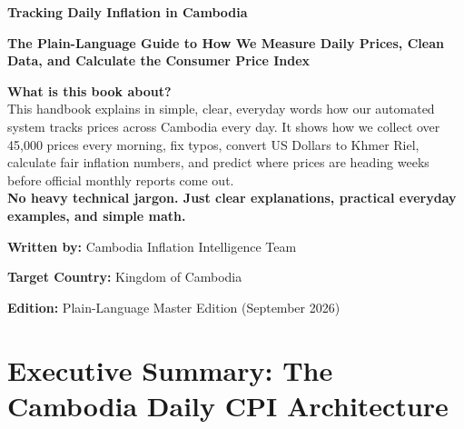 \documentclass[11pt,a4paper,oneside]{article}
\begin{document}
\begin{titlepage}
    \centering
    \vspace*{1.5cm}
    
    {\Huge\bfseries\color{NavyBlue} Tracking Daily Inflation in Cambodia\par}
    \vspace{0.4cm}
    {\LARGE\bfseries\color{Teal} The Plain-Language Guide to How We Measure Daily Prices, Clean Data, and Calculate the Consumer Price Index\par}
    \vspace{1.2cm}
    
    \begin{tcolorbox}[colback=white,colframe=Teal,width=0.94\textwidth]
        \centering\normalsize
        \textbf{What is this book about?}\\
        \vspace{0.2cm}
        This handbook explains in simple, clear, everyday words how our automated system tracks prices across Cambodia every day. It shows how we collect over 45,000 prices every morning, fix typos, convert US Dollars to Khmer Riel, calculate fair inflation numbers, and predict where prices are heading weeks before official monthly reports come out.\\
        \vspace{0.2cm}
        \textbf{No heavy technical jargon. Just clear explanations, practical everyday examples, and simple math.}
    \end{tcolorbox}
    
    \vfill
    
    {\large\textbf{Written by:} Cambodia Inflation Intelligence Team\par}
    {\large\textbf{Target Country:} Kingdom of Cambodia\par}
    {\large\textbf{Edition:} Plain-Language Master Edition (September 2026)\par}
    \vspace{1cm}
\end{titlepage}

\tableofcontents
\newpage

\section*{Executive Summary: The Cambodia Daily CPI Architecture}
\end{document}
